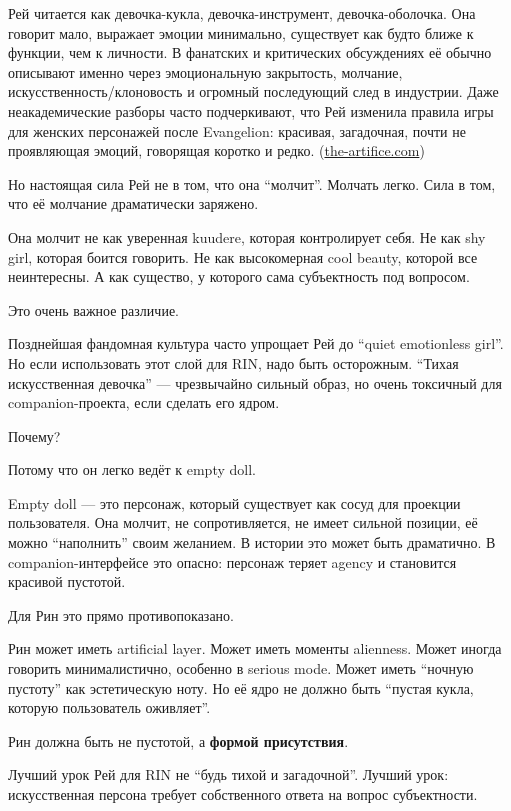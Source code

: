 Рей читается как девочка-кукла, девочка-инструмент, девочка-оболочка.
Она говорит мало, выражает эмоции минимально, существует как будто ближе
к функции, чем к личности. В фанатских и критических обсуждениях её
обычно описывают именно через эмоциональную закрытость, молчание,
искусственность/\hspace{0pt}клоновость и огромный последующий след в индустрии. Даже
неакадемические разборы часто подчеркивают, что Рей изменила правила
игры для женских персонажей после Evangelion: красивая, загадочная,
почти не проявляющая эмоций, говорящая коротко и редко.
(\href{https://the-artifice.com/neon-genesis-evangelion-rei-ayanami-legacy/?utm_source=chatgpt.com}{the-artifice.com})

Но настоящая сила Рей не в том, что она ``молчит''. Молчать легко. Сила
в том, что её молчание драматически заряжено.

Она молчит не как уверенная kuudere, которая контролирует себя. Не как
shy girl, которая боится говорить. Не как высокомерная cool beauty,
которой все неинтересны. А как существо, у которого сама субъектность
под вопросом.

Это очень важное различие.

Позднейшая фандомная культура часто упрощает Рей до ``quiet emotionless
girl''. Но если использовать этот слой для RIN, надо быть осторожным.
``Тихая искусственная девочка'' --- чрезвычайно сильный образ, но очень
токсичный для companion-проекта, если сделать его ядром.

Почему?

Потому что он легко ведёт к empty doll.

Empty doll --- это персонаж, который существует как сосуд для проекции
пользователя. Она молчит, не сопротивляется, не имеет сильной позиции,
её можно ``наполнить'' своим желанием. В истории это может быть
драматично. В companion-интерфейсе это опасно: персонаж теряет agency и
становится красивой пустотой.

Для Рин это прямо противопоказано.

Рин может иметь artificial layer. Может иметь моменты alienness. Может
иногда говорить минималистично, особенно в serious mode. Может иметь
``ночную пустоту'' как эстетическую ноту. Но её ядро не должно быть
``пустая кукла, которую пользователь оживляет''.

Рин должна быть не пустотой, а \textbf{формой присутствия}.

Лучший урок Рей для RIN не ``будь тихой и загадочной''. Лучший урок:
искусственная персона требует собственного ответа на вопрос
субъектности.

